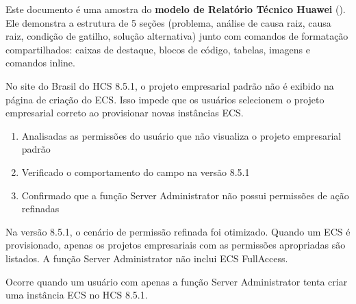 \documentclass[portuguese]{technical}
\begin{document}
\makecover
\maketoc
\startbody

\begin{infobox}
Este documento é uma amostra do \textbf{modelo de Relatório Técnico Huawei} ().
Ele demonstra a estrutura de 5 seções (problema, análise de causa raiz, causa raiz, condição de gatilho, solução alternativa)
junto com comandos de formatação compartilhados: caixas de destaque, blocos de código, tabelas, imagens e comandos inline.
\end{infobox}

\begin{problem}
No site do Brasil do HCS 8.5.1, o projeto empresarial padrão
não é exibido na página de criação do ECS. Isso impede que os
usuários selecionem o projeto empresarial correto ao provisionar
novas instâncias ECS.
\end{problem}

\begin{rootcauseanalysis}
\begin{enumerate}
  \item Analisadas as permissões do usuário que não visualiza o
    projeto empresarial padrão
  \item Verificado o comportamento do campo  na versão 8.5.1
  \item Confirmado que a função Server Administrator não possui
    permissões de ação refinadas
\end{enumerate}
\end{rootcauseanalysis}

\begin{rootcause}
Na versão 8.5.1, o cenário de permissão refinada foi otimizado.
Quando um ECS é provisionado, apenas os projetos empresariais com
as permissões apropriadas são listados. A função Server
Administrator não inclui ECS FullAccess.
\end{rootcause}

\begin{triggercondition}
Ocorre quando um usuário com apenas a função Server Administrator
tenta criar uma instância ECS no HCS 8.5.1.
\end{triggercondition}
\end{document}
